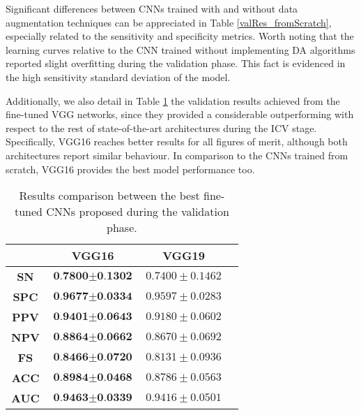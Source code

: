 Significant differences between CNNs trained with and without data augmentation techniques can be appreciated in Table \ref{valRes_fromScratch}, especially related to the sensitivity and specificity metrics. 
Worth noting that the learning curves relative to the CNN trained without implementing DA algorithms reported slight overfitting during the validation phase. This fact is evidenced in the high sensitivity standard deviation of the model.

Additionally, we also detail in Table \ref{valtResults_fineTuning} the validation results achieved from the fine-tuned VGG networks, since they provided a considerable outperforming with respect to the rest of state-of-the-art architectures during the ICV stage. Specifically, VGG16 reaches better results for all figures of merit, although both architectures report similar behaviour. In comparison to the CNNs trained from scratch, VGG16 provides the best model performance too. 

\begin{table}[h]
\caption{Results comparison between the best fine-tuned CNNs proposed during the validation phase.}
\label{valtResults_fineTuning}
\setlength\tabcolsep{8 pt}
\small
\begin{center}
\begin{tabular}{cccc}
\hline
\multicolumn{1}{l}{}{} & \textbf{VGG16}       & \textbf{VGG19} \\
\hline
\textbf{SN}         & $\textbf{0.7800}   \pm \textbf{0.1302}$       & $0.7400 \pm 0.1462$ \\
\textbf{SPC}        & $\textbf{0.9677} \pm \textbf{0.0334}$         & $0.9597\pm 0.0283$\\
\textbf{PPV}        & $\textbf{0.9401} \pm  \textbf{0.0643}$      & $0.9180 \pm 0.0602$ \\
\textbf{NPV}        & $\textbf{0.8864} \pm \textbf{0.0662}$        & $0.8670\pm 0.0692$  \\
\textbf{FS}         & $\textbf{0.8466} \pm  \textbf{0.0720}$       & $0.8131\pm 0.0936$   \\
\textbf{ACC}        & $\textbf{0.8984} \pm  \textbf{0.0468}$      & $0.8786 \pm 0.0563$ \\
\textbf{AUC}        & $\textbf{0.9463} \pm  \textbf{0.0339}$     & $0.9416 \pm 0.0501$\\
\hline
\end{tabular}
\end{center}
\end{table}

